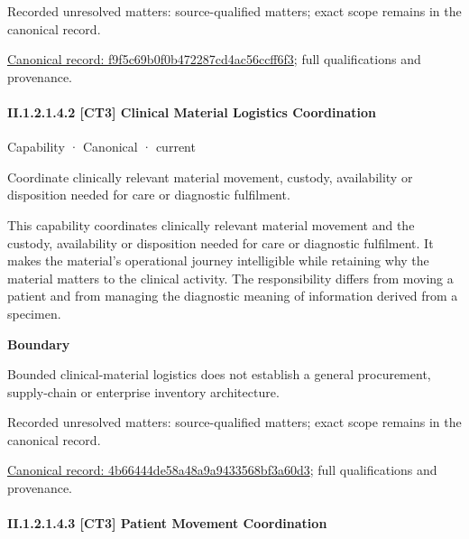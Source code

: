 {\small Recorded unresolved matters: source-qualified matters; exact scope remains in the canonical record.}\par
{\footnotesize \href{../../../../continuum/strategy/capability/f9f5c69b0f0b472287cd4ac56ccff6f3.md}{Canonical record: f9f5c69b0f0b472287cd4ac56ccff6f3}; full qualifications and provenance.}\par
\paragraph*{II.1.2.1.4.2 [CT3] Clinical Material Logistics Coordination}
\label{navigation:II.1.2.1.4.2}

\label{element:4b66444de58a48a9a9433568bf3a60d3}
{\small Capability · Canonical · current}\par

Coordinate clinically relevant material movement, custody, availability or disposition needed for care or diagnostic fulfilment.



This capability coordinates clinically relevant material movement and the custody, availability or disposition needed for care or diagnostic fulfilment. It makes the material's operational journey intelligible while retaining why the material matters to the clinical activity. The responsibility differs from moving a patient and from managing the diagnostic meaning of information derived from a specimen.



\textbf{Boundary}



Bounded clinical-material logistics does not establish a general procurement, supply-chain or enterprise inventory architecture.


{\small Recorded unresolved matters: source-qualified matters; exact scope remains in the canonical record.}\par
{\footnotesize \href{../../../../continuum/strategy/capability/4b66444de58a48a9a9433568bf3a60d3.md}{Canonical record: 4b66444de58a48a9a9433568bf3a60d3}; full qualifications and provenance.}\par
\paragraph*{II.1.2.1.4.3 [CT3] Patient Movement Coordination}
\label{navigation:II.1.2.1.4.3}

